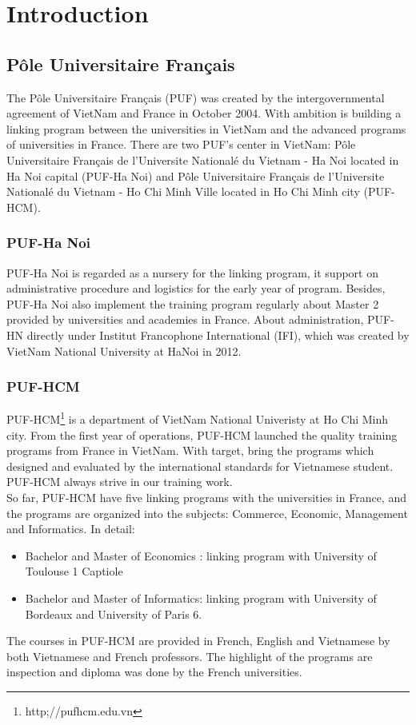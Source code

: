 \chapter{Introduction}
\section{P\^{o}le Universitaire Fran\c{c}ais}
The P\^{o}le Universitaire Fran\c{c}ais (PUF) was created by the intergovernmental agreement of VietNam and France in October 2004. With ambition is building a linking program between the universities in VietNam and the advanced programs of universities in France. There are two PUF's center in VietNam: P\^{o}le Universitaire Fran\c{c}ais de l'Universite National\'{e} du Vietnam - Ha Noi located in Ha Noi capital (PUF-Ha Noi) and P\^{o}le Universitaire Fran\c{c}ais de l'Universite National\'{e} du Vietnam - Ho Chi Minh Ville located in Ho Chi Minh city (PUF-HCM).
\subsection{PUF-Ha Noi}
PUF-Ha Noi is regarded as a nursery for the linking program, it support on administrative procedure and logistics for the early year of program. Besides, PUF-Ha Noi also implement the training program regularly about Master 2 provided by universities and academies in France. About administration, PUF-HN directly under Institut Francophone International (IFI), which was created by VietNam National University at HaNoi in 2012.
\subsection{PUF-HCM}
PUF-HCM\footnote{http;//pufhcm.edu.vn} is a department of VietNam National Univeristy at Ho Chi Minh city. From the first year of operations, PUF-HCM launched the quality training programs from France in VietNam. With target, bring the programs which designed and evaluated by the international standards for Vietnamese student. PUF-HCM always strive in our training work.\\
So far, PUF-HCM have five linking programs with the universities in France, and the programs are organized into the subjects: Commerce, Economic, Management and Informatics. In detail:
\begin{itemize}
\item Bachelor and Master of Economics : linking program with University of Toulouse 1 Captiole
\item Bachelor and Master of Informatics: linking program with University of Bordeaux and University of Paris 6.
\end{itemize}
The courses in PUF-HCM are provided in French, English and Vietnamese by both Vietnamese and French professors. The highlight of the programs are inspection and diploma was done by the French universities.
